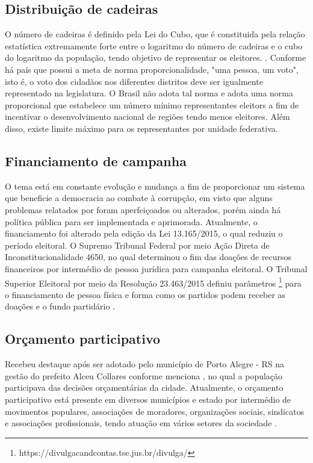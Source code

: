 \subsection{Distribuição de cadeiras}

O número de cadeiras é definido pela Lei do Cubo, que é constituida pela relação estatística extremamente forte entre o logaritmo do número de cadeiras e o cubo do logaritmo da população, tendo objetivo de representar os eleitores. \cite{leonardo_avritzer_2006}.
Conforme \cite{leonardo_avritzer_2006} há país que possui a meta de norma proporcionalidade, "uma pessoa, um voto", isto é, o voto dos cidadãos nos diferentes distritos deve ser igualmente representado na legislatura.
O Brasil não adota tal norma e adota uma norma proporcional que estabelece um número mínimo representantes eleitors a fim de incentivar o desenvolvimento nacional de regiões tendo menos eleitores. 
Além disso, existe limite máximo para os representantes por unidade federativa.


\subsection{Financiamento de campanha}

O tema está em constante evolução e mudança a fim de proporcionar um sistema que beneficie a democracia ao combate à corrupção, em visto que alguns problemas relatados por  foram aperfeiçoados ou alterados, porém ainda há política pública para ser implementada e aprimorada.
Atualmente, o financiamento foi alterado pela edição da Lei 13.165/2015, o qual reduziu o período eleitoral.  
O Supremo Tribunal Federal por meio Ação Direta de Inconstitucionalidade 4650, no qual determinou o fim das doações de recursos financeiros por intermédio de pessoa jurídica para campanha eleitoral.
O Tribunal Superior Eleitoral por meio da Resolução 23.463/2015 definiu parâmetros \footnote{https://divulgacandcontas.tse.jus.br/divulga/} para o financiamento de pessoa física e forma como os partidos podem receber as doações e o fundo partidário \cite{agra2019financiamento_eleitoral}.


\subsection{Orçamento participativo}

Recebeu destaque após ser adotado pelo município de Porto Alegre - RS na gestão do prefeito Alceu Collares conforme menciona , no qual a população participava das decisões orçamentárias da cidade.
Atualmente, o orçamento participativo está presente em diversos municípios e estado por intermédio de movimentos populares, associações de moradores, organizações sociais, sindicatos e associações profissionais, tendo atuação em vários setores da sociedade \cite{leonardo_avritzer_2008_orc_part}.